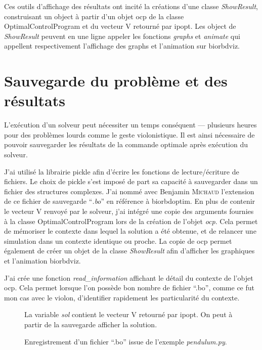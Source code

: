 Ces outils d'affichage des résultats ont incité la créations d'une classe \emph{ShowResult}, construisant un object à partir d'un objet ocp de la classe OptimalControlProgram et du vecteur V retourné par \gls{ipopt}. Les object de \emph{ShowResult} peuvent en une ligne appeler les fonctions \emph{graphs} et \emph{animate} qui appellent respectivement l'affichage des graphs et l'animation sur \gls{biorbdviz}.   

        \section{Sauvegarde du problème et des résultats}
        
L'exécution d'un solveur peut nécessiter un temps conséquent --- plusieurs heures pour des problèmes lourds comme le geste violonistique. Il est ainsi nécessaire de pouvoir sauvegarder les résultats de la commande optimale après exécution du solveur.

J'ai utilisé la librairie \gls{pickle} afin d'écrire les fonctions de lecture/écriture de fichiers. Le choix de \gls{pickle} s'est imposé de part sa capacité à sauvegarder dans un fichier des structures complexes. J'ai nommé avec Benjamin \textsc{Michaud} l'extension de ce fichier de sauvegarde ``\emph{.bo}'' en référence à \gls{biorbdoptim}. En plus de contenir le vecteur V renvoyé par le solveur, j'ai intégré une copie des arguments fournies à la classe OptimalControlProgram lors de la création de l'objet \emph{ocp}. Cela permet de mémoriser le contexte dans lequel la solution a été obtenue, et de relancer une simulation dans un contexte identique ou proche. La copie de ocp permet également de créer un objet de la classe \emph{ShowResult} afin d'afficher les graphiques et l'animation \gls{biorbdviz}.

J'ai crée une fonction \emph{read\_information} affichant le détail du contexte de l'objet ocp. Cela permet lorsque l'on possède bon nombre de fichier ``.bo'', comme ce fut mon cas avec le violon, d'identifier rapidement les particularité du contexte.

\begin{center}
\setlength\itemsep{-0.5em}

\vspace{-0.6cm}
\begin{figure}[h]
\caption{Enregistrement d'un fichier ``.bo'' issue de l'exemple \emph{pendulum.py}.}
La variable \emph{sol} contient le vecteur V retourné par \gls{ipopt}. On peut à partir de la sauvegarde afficher la solution.
\label{fig:savebo}
\end{figure}
\end{center}

